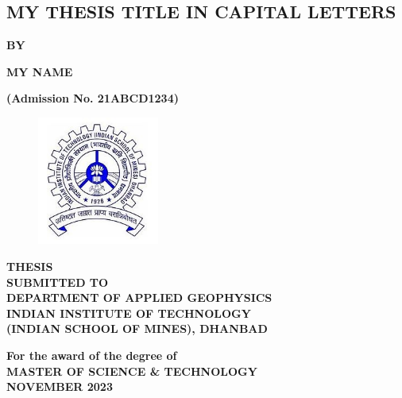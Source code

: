 \documentclass[12pt]{article}
\begin{document}
\begin{titlepage}
\begin{center}
   \section*{\fontsize{24}{24}\selectfont MY THESIS TITLE IN CAPITAL LETTERS}
   

\textbf{BY}

\textbf{\fontsize{14}{16}\selectfont MY NAME}

\textbf{\fontsize{14}{16}\selectfont (Admission No. 21ABCD1234)}


\begin{figure}[H]
    \centering
    \includegraphics[width=4cm]{ismlogo.jpg}
   
    \label{fig:enter-labe2l}
\end{figure}

\textbf{\fontsize{14}{16}\selectfont THESIS\\ SUBMITTED TO\\
DEPARTMENT OF APPLIED GEOPHYSICS\\
INDIAN INSTITUTE OF TECHNOLOGY\\
(INDIAN SCHOOL OF MINES), DHANBAD\\}


\vspace{1cm}

\textbf{\fontsize{14}{16}\selectfont For the award of the degree of\\
MASTER OF SCIENCE \& TECHNOLOGY\\   %
NOVEMBER 2023}

\end{center}

\end{titlepage}
\restoregeometry %
\end{document}
